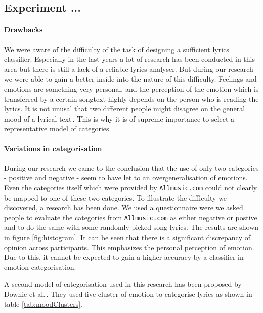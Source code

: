 \documentclass[a4paper,12pt]{article}
\begin{document}
\subsection{Experiment ...}

\paragraph{Drawbacks} We were aware of the difficulty of the task of designing a sufficient lyrics classifier. Especially in the last years a lot of research has been conducted in this area but there is still a lack of a reliable lyrics analyser. But during our research we were able to gain a better inside into the nature of this difficulty. Feelings and emotions are something very personal, and the perception of the emotion which is transferred by a certain songtext highly depends on the person who is reading the lyrics. It is not unusal that two different people might disagree on the general mood of a lyrical text\,\cite{wilson2005recognizing}. This is why it is of supreme importance to select a representative model of categories.

\paragraph{Variations in categorisation} During our research we came to the conclusion that the use of only two categories - positive and negative - seem to have let to an overgeneralisation of emotions. Even the categories itself which were provided by \texttt{Allmusic.com} could not clearly be mapped to one of these two categories. To illustrate the difficulty we discovered, a research has been done. We used a questionnaire were we asked people to evaluate the categories from \texttt{Allmusic.com} as either negative or postive and to do the same with some randomly picked song lyrics. The results are shown in figure \ref{fig:histogram}. It can be seen that there is a significant discrepancy of opinion across participants. This emphasizes the personal perception of emotion. Due to this, it cannot be expected to gain a higher accuracy by a classifier in emotion categorisation.

A second model of categorisation used in this research has been proposed by Downie et al.\,\cite{downie20082007}. They used five cluster of emotion to categorise lyrics as shown in table \ref{tab:moodClusters}.
\end{document}
